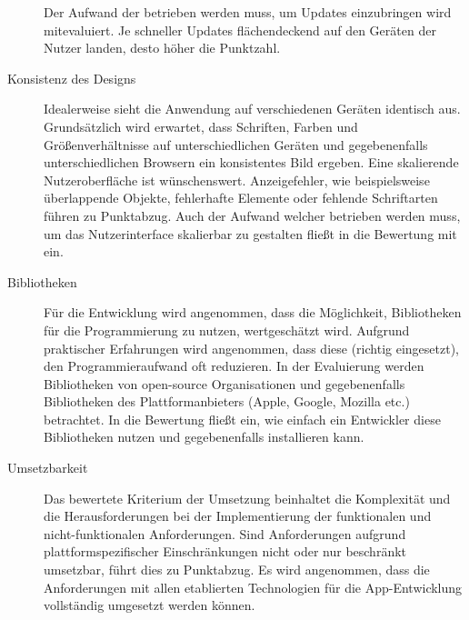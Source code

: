 \begin{description}
	      Der Aufwand der betrieben werden muss, um Updates einzubringen wird mitevaluiert. Je schneller Updates flächendeckend auf den Geräten der Nutzer landen, desto höher die Punktzahl.

	\item [Konsistenz des Designs]
	      Idealerweise sieht die Anwendung auf verschiedenen Geräten identisch aus. Grundsätzlich wird erwartet, dass Schriften, Farben und Größenverhältnisse auf unterschiedlichen Geräten und gegebenenfalls unterschiedlichen Browsern ein konsistentes Bild ergeben.
	      Eine skalierende Nutzeroberfläche ist wünschenswert. Anzeigefehler, wie beispielsweise überlappende Objekte, fehlerhafte Elemente oder fehlende Schriftarten führen zu Punktabzug. Auch der Aufwand welcher betrieben werden muss, um das Nutzerinterface skalierbar zu gestalten fließt in die Bewertung mit ein.

	      

	\item[Bibliotheken]
		Für die Entwicklung wird angenommen, dass die Möglichkeit, Bibliotheken für die Programmierung zu nutzen, wertgeschätzt wird. Aufgrund praktischer Erfahrungen wird angenommen, dass diese (richtig eingesetzt), den Programmieraufwand oft reduzieren. In der Evaluierung werden Bibliotheken von open-source Organisationen und gegebenenfalls Bibliotheken des Plattformanbieters (Apple, Google, Mozilla etc.) betrachtet. In die Bewertung fließt ein, wie einfach ein Entwickler diese Bibliotheken nutzen und gegebenenfalls installieren kann. 

	\item[Umsetzbarkeit]
		Das bewertete Kriterium der Umsetzung beinhaltet die Komplexität und die Herausforderungen bei der Implementierung der funktionalen und nicht-funktionalen Anforderungen. Sind Anforderungen aufgrund plattformspezifischer Einschränkungen nicht oder nur beschränkt umsetzbar, führt dies zu Punktabzug. Es wird angenommen, dass die Anforderungen mit allen etablierten Technologien für die App-Entwicklung vollständig umgesetzt werden können.
		

\end{description}
